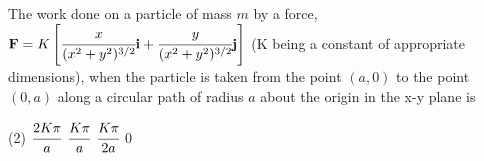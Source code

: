 
\item The work done on a particle of mass $m$ by a force, $\mathbf{F} = K \left[ \cfrac{x}{(x^2 + y^2)^{3/2}} \mathbf{i} + \cfrac{y}{(x^2 + y^2)^{3/2}} \mathbf{j} \right]$ (K being a constant of appropriate dimensions), when the particle is taken from the point $(a, 0)$ to the point $(0, a)$ along a circular path of radius $a$ about the origin in the x-y plane is

\begin{tasks}(2)
    \task $\cfrac{2K\pi}{a}$
    \task $\cfrac{K\pi}{a}$
    \task $\cfrac{K\pi}{2a}$
    \task $0$
\end{tasks}
